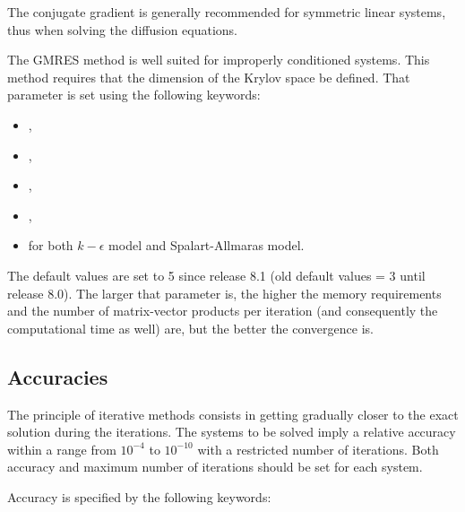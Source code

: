 The conjugate gradient is generally recommended for symmetric linear systems,
thus when solving the diffusion equations.

The GMRES method is well suited for improperly conditioned systems. This method
requires that the dimension of the Krylov space be defined. That parameter is
set using the following keywords:

\begin{itemize}
\item {},

\item {},

\item {},

\item {},

\item {}
for both $k-\epsilon$ model and Spalart-Allmaras model.
\end{itemize}

The default values are set to 5 since release 8.1 (old default values
= 3 until release 8.0). The larger that parameter is, the higher the
memory requirements and the number of matrix-vector products per iteration (and
consequently the computational time as well) are, but the better the
convergence is.

\subsection{Accuracies}
\label{sec:accuracy}
The principle of iterative methods consists in getting gradually closer to the
exact solution during the iterations. The systems to be solved imply a relative
accuracy within a range from $10^{-4}$ to $10^{-10}$ with a restricted
number of iterations. Both accuracy and maximum number of iterations should be
set for each system.

Accuracy is specified by the following keywords:

